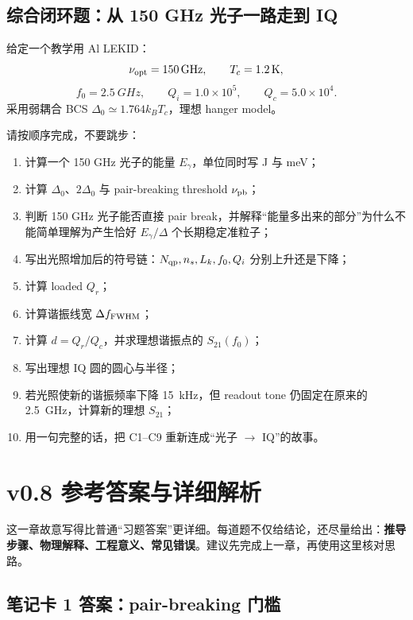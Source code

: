 \documentclass[11pt,a4paper,openany]{ctexrep}
\begin{document}
\section{综合闭环题：从 150 GHz 光子一路走到 IQ}

\begin{projectbox}
给定一个教学用 Al LEKID：
\[
\nu_{\rm opt}=\SI{150}{GHz},\qquad T_c=\SI{1.2}{K},
\]
\[
f_0=\SI{2.5}{GHz},\qquad Q_i=1.0\times10^5,\qquad Q_c=5.0\times10^4.
\]
采用弱耦合 BCS $\Delta_0\simeq1.764k_BT_c$，理想 hanger model。
\end{projectbox}

请按顺序完成，不要跳步：
\begin{enumerate}[label=\textbf{C\arabic*.}]
  \item 计算一个 150 GHz 光子的能量 $E_\gamma$，单位同时写 J 与 meV；
  \item 计算 $\Delta_0$、$2\Delta_0$ 与 pair-breaking threshold $\nu_{\rm pb}$；
  \item 判断 150 GHz 光子能否直接 pair break，并解释“能量多出来的部分”为什么不能简单理解为产生恰好 $E_\gamma/\Delta$ 个长期稳定准粒子；
  \item 写出光照增加后的符号链：$N_{\rm qp},n_s,L_k,f_0,Q_i$ 分别上升还是下降；
  \item 计算 loaded $Q_r$；
  \item 计算谐振线宽 $\Delta f_{\rm FWHM}$；
  \item 计算 $d=Q_r/Q_c$，并求理想谐振点的 $S_{21}(f_0)$；
  \item 写出理想 IQ 圆的圆心与半径；
  \item 若光照使新的谐振频率下降 \SI{15}{kHz}，但 readout tone 仍固定在原来的 \SI{2.5}{GHz}，计算新的理想 $S_{21}$；
  \item 用一句完整的话，把 C1--C9 重新连成“光子 $\rightarrow$ IQ”的故事。
\end{enumerate}

\clearpage
\chapter{v0.8 参考答案与详细解析}

\begin{goalbox}
这一章故意写得比普通“习题答案”更详细。每道题不仅给结论，还尽量给出：\textbf{推导步骤、物理解释、工程意义、常见错误}。建议先完成上一章，再使用这里核对思路。
\end{goalbox}

\section{笔记卡 1 答案：pair-breaking 门槛}
\end{document}
